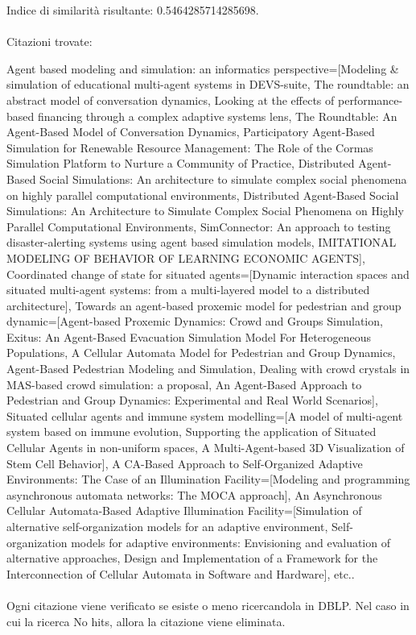 \documentclass[12pt]{article}
\begin{document}
Indice di similarit\`a risultante: 0.5464285714285698. \\
\\
Citazioni trovate:
{Agent based modeling and simulation: an informatics perspective=[Modeling \& simulation of educational multi-agent systems in DEVS-suite, The roundtable: an abstract model of conversation dynamics, Looking at the effects of performance-based financing through a complex adaptive systems lens, The Roundtable: An Agent-Based Model of Conversation Dynamics, Participatory Agent-Based Simulation for Renewable Resource Management: The Role of the Cormas Simulation Platform to Nurture a Community of Practice, Distributed Agent-Based Social Simulations: An architecture to simulate complex social phenomena on highly parallel computational environments, Distributed Agent-Based Social Simulations: An Architecture to Simulate Complex Social Phenomena on Highly Parallel Computational Environments, SimConnector: An approach to testing disaster-alerting systems using agent based simulation models, IMITATIONAL MODELING OF BEHAVIOR OF LEARNING ECONOMIC AGENTS], Coordinated change of state for situated agents=[Dynamic interaction spaces and situated multi-agent systems: from a multi-layered model to a distributed architecture], Towards an agent-based proxemic model for pedestrian and group dynamic=[Agent-based Proxemic Dynamics: Crowd and Groups Simulation, Exitus: An Agent-Based Evacuation Simulation Model For Heterogeneous Populations, A Cellular Automata Model for Pedestrian and Group Dynamics, Agent-Based Pedestrian Modeling and Simulation, Dealing with crowd crystals in MAS-based crowd simulation: a proposal, An Agent-Based Approach to Pedestrian and Group Dynamics: Experimental and Real World Scenarios], Situated cellular agents and immune system modelling=[A model of multi-agent system based on immune evolution, Supporting the application of Situated Cellular Agents in non-uniform spaces, A Multi-Agent-based 3D Visualization of Stem Cell Behavior], A CA-Based Approach to Self-Organized Adaptive Environments: The Case of an Illumination Facility=[Modeling and programming asynchronous automata networks: The MOCA approach], An Asynchronous Cellular Automata-Based Adaptive Illumination Facility=[Simulation of alternative self-organization models for an adaptive environment, Self-organization models for adaptive environments: Envisioning and evaluation of alternative approaches, Design and Implementation of a Framework for the Interconnection of Cellular Automata in Software and Hardware], etc.. \\\\
Ogni citazione viene verificato se esiste o meno ricercandola in DBLP. Nel caso in cui la ricerca No hits, allora la citazione viene eliminata.

}
\end{document}
